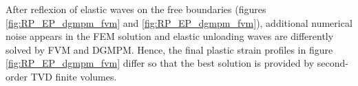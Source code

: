 After reflexion of elastic waves on the free boundaries (figures \ref{fig:RP_EP_dgmpm_fvm} and \ref{fig:RP_EP_dgmpm_fvm}), additional numerical noise appears in the FEM solution and elastic unloading waves are differently solved by FVM and DGMPM. Hence, the final plastic strain profiles in figure \ref{fig:RP_EP_dgmpm_fvm} differ so that the best solution is provided by second-order TVD finite volumes.

